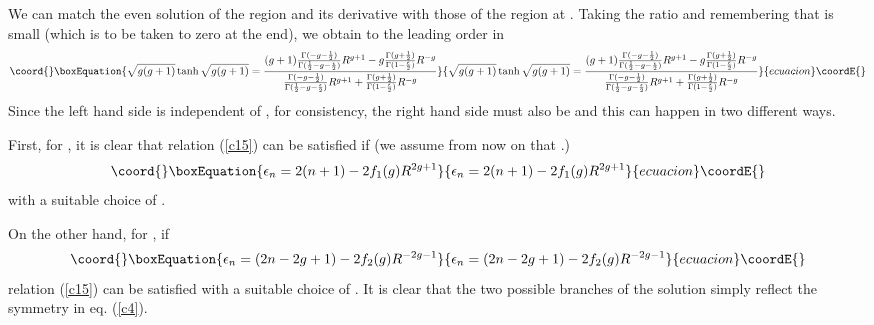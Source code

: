 \documentclass[a4paper,11pt]{article}
\begin{document}
We can match the even solution of the region \coordHE{} and its
derivative with those of the region \coordHE{} at \coordHE{}. Taking the ratio
and remembering that \coordHE{} is small (which is to be taken to zero at the
end), we obtain to the leading order in \coordHE{}
\begin{equation}\coord{}\boxEquation{
\sqrt{g(g+1)}\tanh \sqrt{g(g+1)} =\frac{(g+1){\Gamma(-g-{1\over
2})\over \Gamma({1\over 2}-g-{\epsilon\over
2})}R^{g+1}-g{\Gamma(g+{1\over 2})\over \Gamma(1-{\epsilon\over
2})}R^{-g}}{{\Gamma(-g-{1\over
2})\over \Gamma({1\over 2}-g-{\epsilon\over
2})}R^{g+1}+{\Gamma(g+{1\over 2})\over \Gamma(1-{\epsilon\over
2})}R^{-g}}\label{c15}
}{
\sqrt{g(g+1)}\tanh \sqrt{g(g+1)} =\frac{(g+1){\Gamma(-g-{1\over
2})\over \Gamma({1\over 2}-g-{\epsilon\over
2})}R^{g+1}-g{\Gamma(g+{1\over 2})\over \Gamma(1-{\epsilon\over
2})}R^{-g}}{{\Gamma(-g-{1\over
2})\over \Gamma({1\over 2}-g-{\epsilon\over
2})}R^{g+1}+{\Gamma(g+{1\over 2})\over \Gamma(1-{\epsilon\over
2})}R^{-g}}}{ecuacion}\coordE{}\end{equation}
Since the left hand side is independent of \coordHE{}, for consistency, the
right hand side must also be and this can happen in two different
ways.

First, for \coordHE{}, it is clear that relation (\ref{c15}) can
be satisfied if (we assume from now on that \coordHE{}.)
\begin{equation}\coord{}\boxEquation{
 \epsilon_{n}  =  2(n+1) -
2f_{1}(g)R^{2g+1}\label{c16}
}{
 \epsilon_{n}  =  2(n+1) -
2f_{1}(g)R^{2g+1}}{ecuacion}\coordE{}\end{equation}
with a suitable choice of \coordHE{}.

On the other hand, for \coordHE{}, if
\begin{equation}\coord{}\boxEquation{
 \epsilon_{n} =  (2n-2g+1) -
2f_{2}(g)R^{-2g-1}\label{c17}
}{
 \epsilon_{n} =  (2n-2g+1) -
2f_{2}(g)R^{-2g-1}}{ecuacion}\coordE{}\end{equation}
relation (\ref{c15}) can be satisfied with a suitable choice of
\coordHE{}. It is clear that the two possible branches of the solution
simply reflect the symmetry in eq. (\ref{c4}).
\end{document}
